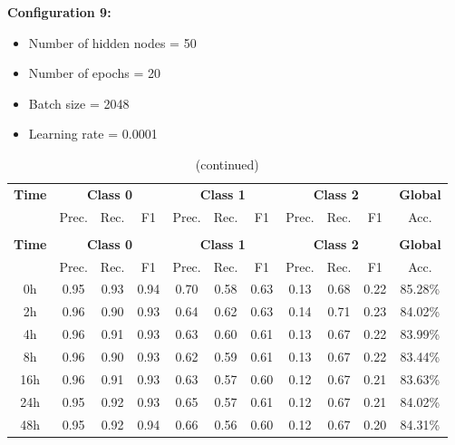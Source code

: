 \documentclass[12pt,oneside]{book} %
\begin{document}
\noindent \textbf{Configuration 9:}
\begin{multicols}{2}
    \begin{itemize}
        \item Number of hidden nodes = 50
        \item Number of epochs = 20
    \end{itemize}
    \begin{itemize}
         \item Batch size = 2048
         \item Learning rate = 0.0001
    \end{itemize}
\end{multicols}

\setlength\LTleft{1cm}
\begin{longtable}{ c ccc ccc ccc c}
\caption{Performance metrics of the LNN model for configuration 9} \\
\toprule
\textbf{Time} & \multicolumn{3}{c}{\textbf{Class 0}} & \multicolumn{3}{c}{\textbf{Class 1}} & \multicolumn{3}{c}{\textbf{Class 2}} & \textbf{Global} \\
               & Prec. & Rec. & F1  & Prec. & Rec. & F1   & Prec. & Rec. & F1  & Acc. \\
\midrule
\endfirsthead

\caption[]{(continued)} \\
\toprule
\textbf{Time} & \multicolumn{3}{c}{\textbf{Class 0}} & \multicolumn{3}{c}{\textbf{Class 1}} & \multicolumn{3}{c}{\textbf{Class 2}} & \textbf{Global} \\
               & Prec. & Rec. & F1  & Prec. & Rec. & F1   & Prec. & Rec. & F1  & Acc. \\
\midrule
\endhead

\bottomrule
\endfoot

\bottomrule
\endlastfoot

0h   & 0.95  & 0.93 & 0.94 & 0.70  & 0.58 & 0.63  & 0.13  & 0.68 & 0.22 & 85.28\% \\
2h   & 0.96  & 0.90 & 0.93 & 0.64  & 0.62 & 0.63  & 0.14  & 0.71 & 0.23 & 84.02\% \\
4h   & 0.96  & 0.91 & 0.93 & 0.63  & 0.60 & 0.61  & 0.13  & 0.67 & 0.22 & 83.99\% \\
8h   & 0.96  & 0.90 & 0.93 & 0.62  & 0.59 & 0.61  & 0.13  & 0.67 & 0.22 & 83.44\% \\
16h  & 0.96  & 0.91 & 0.93 & 0.63  & 0.57 & 0.60  & 0.12  & 0.67 & 0.21 & 83.63\% \\
24h  & 0.95  & 0.92 & 0.93 & 0.65  & 0.57 & 0.61  & 0.12  & 0.67 & 0.21 & 84.02\% \\
48h  & 0.95  & 0.92 & 0.94 & 0.66  & 0.56 & 0.60  & 0.12  & 0.67 & 0.20 & 84.31\% \\
\end{longtable}
\end{document}
